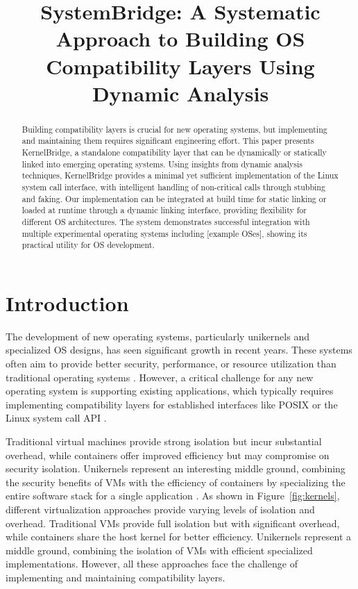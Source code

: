 \documentclass[conference]{IEEEtran}
\begin{document}
\title{SystemBridge: A Systematic Approach to Building OS Compatibility Layers Using Dynamic Analysis}

\author{
	}

\maketitle

\begin{abstract}
	Building compatibility layers is crucial for new operating systems, but implementing and maintaining them requires significant engineering effort. This paper presents KernelBridge, a standalone compatibility layer that can be dynamically or statically linked into emerging operating systems. Using insights from dynamic analysis techniques, KernelBridge provides a minimal yet sufficient implementation of the Linux system call interface, with intelligent handling of non-critical calls through stubbing and faking. Our implementation can be integrated at build time for static linking or loaded at runtime through a dynamic linking interface, providing flexibility for different OS architectures. The system demonstrates successful integration with multiple experimental operating systems including [example OSes], showing its practical utility for OS development.
\end{abstract}

\section{Introduction}
The development of new operating systems, particularly unikernels and specialized OS designs, has seen significant growth in recent years. These systems often aim to provide better security, performance, or resource utilization than traditional operating systems \cite{madhavapeddy2015unikernels}. However, a critical challenge for any new operating system is supporting existing applications, which typically requires implementing compatibility layers for established interfaces like POSIX or the Linux system call API \cite{linux_kernel_clothing}.

Traditional virtual machines provide strong isolation but incur substantial overhead, while containers offer improved efficiency but may compromise on security isolation. Unikernels represent an interesting middle ground, combining the security benefits of VMs with the efficiency of containers by specializing the entire software stack for a single application \cite{unikernels_vs_containers}. As shown in Figure~\ref{fig:kernels}, different virtualization approaches provide varying levels of isolation and overhead. Traditional VMs provide full isolation but with significant overhead, while containers share the host kernel for better efficiency. Unikernels represent a middle ground, combining the isolation of VMs with efficient specialized implementations. However, all these approaches face the challenge of implementing and maintaining compatibility layers.
\end{document}
